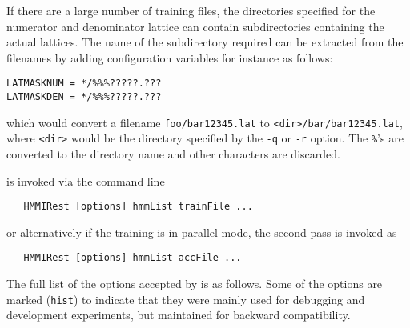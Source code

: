 If there are a large number of training files, the directories specified for
the numerator and denominator lattice can contain subdirectories containing
the actual lattices.  The name of the subdirectory required can be extracted
from the filenames by adding configuration variables for instance as follows:
\begin{verbatim}
LATMASKNUM = */%%%?????.???
LATMASKDEN = */%%%?????.???
\end{verbatim}
which would convert a filename \texttt{foo/bar12345.lat} to \texttt{<dir>/bar/bar12345.lat},
where \texttt{<dir>} would be the directory specified by the \texttt{-q} or \texttt{-r} option.
The \texttt{\%}'s are converted to the directory name and other characters are discarded.

 \label{sec:hmmirestuse}

 is invoked via the command line
\begin{verbatim}
   HMMIRest [options] hmmList trainFile ...
\end{verbatim}
or alternatively if the training is in parallel mode, the second pass is invoked as
\begin{verbatim}
   HMMIRest [options] hmmList accFile ...
\end{verbatim}

The full list of the options accepted by  is as follows. Some
of the options are marked (\texttt{hist}) to indicate that they were mainly
used for debugging and development experiments, but maintained for backward compatibility.

